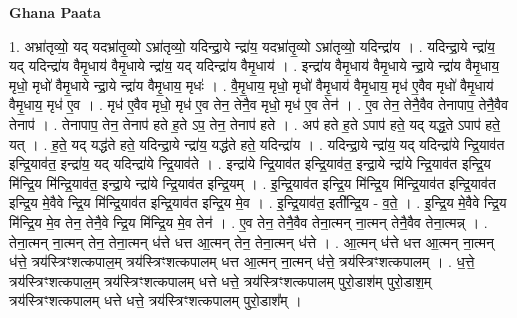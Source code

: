 \documentclass[17pt]{extarticle}
\begin{document}
\textbf{Ghana Paata } \newline

1. अभ्रा॑तृव्यो॒ यद् यदभ्रा॑तृ॒व्यो ऽभ्रा॑तृव्यो॒ यदिन्द्रा॒ये न्द्रा॑य॒ यदभ्रा॑तृ॒व्यो ऽभ्रा॑तृव्यो॒ यदिन्द्रा॑य । . यदिन्द्रा॒ये न्द्रा॑य॒ यद् यदिन्द्रा॑य वैमृ॒धाय॑ वैमृ॒धाये न्द्रा॑य॒ यद् यदिन्द्रा॑य वैमृ॒धाय॑ । . इन्द्रा॑य वैमृ॒धाय॑ वैमृ॒धाये न्द्रा॒ये न्द्रा॑य वैमृ॒धाय॒ मृधो॒ मृधो॑ वैमृ॒धाये न्द्रा॒ये न्द्रा॑य वैमृ॒धाय॒ मृधः॑ । . वै॒मृ॒धाय॒ मृधो॒ मृधो॑ वैमृ॒धाय॑ वैमृ॒धाय॒ मृध॑ ए॒वैव मृधो॑ वैमृ॒धाय॑ वैमृ॒धाय॒ मृध॑ ए॒व । . मृध॑ ए॒वैव मृधो॒ मृध॑ ए॒व तेन॒ तेनै॒व मृधो॒ मृध॑ ए॒व तेन॑ । . ए॒व तेन॒ तेनै॒वैव तेनापाप॒ तेनै॒वैव तेनाप॑ । . तेनापाप॒ तेन॒ तेनाप॑ हते ह॒ते ऽप॒ तेन॒ तेनाप॑ हते । . अप॑ हते ह॒ते ऽपाप॑ हते॒ यद् यद्ध॒ते ऽपाप॑ हते॒ यत् । . ह॒ते॒ यद् यद्ध॑ते हते॒ यदिन्द्रा॒ये न्द्रा॑य॒ यद्ध॑ते हते॒ यदिन्द्रा॑य । . यदिन्द्रा॒ये न्द्रा॑य॒ यद् यदिन्द्रा॑ये न्द्रि॒याव॑त इन्द्रि॒याव॑त॒ इन्द्रा॑य॒ यद् यदिन्द्रा॑ये न्द्रि॒याव॑ते । . इन्द्रा॑ये न्द्रि॒याव॑त इन्द्रि॒याव॑त॒ इन्द्रा॒ये न्द्रा॑ये न्द्रि॒याव॑त इन्द्रि॒य मि॑न्द्रि॒य मि॑न्द्रि॒याव॑त॒ इन्द्रा॒ये न्द्रा॑ये न्द्रि॒याव॑त इन्द्रि॒यम् । . इ॒न्द्रि॒याव॑त इन्द्रि॒य मि॑न्द्रि॒य मि॑न्द्रि॒याव॑त इन्द्रि॒याव॑त इन्द्रि॒य मे॒वैवे न्द्रि॒य मि॑न्द्रि॒याव॑त इन्द्रि॒याव॑त इन्द्रि॒य मे॒व । . इ॒न्द्रि॒याव॑त॒ इती᳚न्द्रि॒य - व॒ते॒ । . इ॒न्द्रि॒य मे॒वैवे न्द्रि॒य मि॑न्द्रि॒य मे॒व तेन॒ तेनै॒वे न्द्रि॒य मि॑न्द्रि॒य मे॒व तेन॑ । . ए॒व तेन॒ तेनै॒वैव तेना॒त्मन् ना॒त्मन् तेनै॒वैव तेना॒त्मन्न् । . तेना॒त्मन् ना॒त्मन् तेन॒ तेना॒त्मन् ध॑त्ते धत्त आ॒त्मन् तेन॒ तेना॒त्मन् ध॑त्ते । . आ॒त्मन् ध॑त्ते धत्त आ॒त्मन् ना॒त्मन् ध॑त्ते॒ त्रय॑स्त्रिꣳशत्कपाल॒म् त्रय॑स्त्रिꣳशत्कपालम् धत्त आ॒त्मन् ना॒त्मन् ध॑त्ते॒ त्रय॑स्त्रिꣳशत्कपालम् । . ध॒त्ते॒ त्रय॑स्त्रिꣳशत्कपाल॒म् त्रय॑स्त्रिꣳशत्कपालम् धत्ते धत्ते॒ त्रय॑स्त्रिꣳशत्कपालम् पुरो॒डाश॑म् पुरो॒डाश॒म् त्रय॑स्त्रिꣳशत्कपालम् धत्ते धत्ते॒ त्रय॑स्त्रिꣳशत्कपालम् पुरो॒डाश᳚म् । \newline
\end{document}
